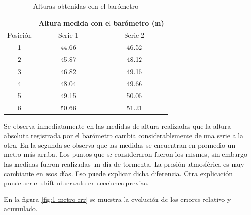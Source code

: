 \documentclass[spanish,12pt,a4paper,titlepage]{report}
\begin{document}
\begin{table}[H]
\centering
\begin{tabular}{c|c|c|} 
	& \multicolumn{2}{|p{200pt}|}{\cellcolor[gray]{0.8} Altura medida con el barómetro (m)}      \\ \hline
\cellcolor[gray]{0.8} {Posición} & \cellcolor[gray]{0.8} {Serie 1} &\cellcolor[gray]{0.8} {Serie 2}\\ \hline

\multicolumn{1}{|c|}{1} & 44.66 & 46.52 \\ \hline
\multicolumn{1}{|c|}{2} & 45.87 & 48.12\\ \hline
\multicolumn{1}{|c|}{3} & 46.82 & 49.15\\ \hline
\multicolumn{1}{|c|}{4} & 48.04 & 49.66\\ \hline
\multicolumn{1}{|c|}{5} & 49.15 & 50.05\\ \hline
\multicolumn{1}{|c|}{6} & 50.66 & 51.21 \\ \hline

\end{tabular}
\caption{Alturas obtenidas con el barómetro}
\label{tab:alturasm}
\end{table}

Se observa inmediatamente en las medidas de altura realizadas que la altura absoluta registrada por el barómetro cambia considerablemente de una serie a la otra. En la segunda se observa que las medidas se encuentran en promedio un metro más arriba. Los puntos que se consideraron fueron los mismos, sin embargo las medidas fueron realizadas un día de tormenta. La presión atmosférica es muy cambiante en esos días. Eso puede explicar dicha diferencia. Otra explicación puede ser el drift observado en secciones previas.

En la figura \ref{fig:1-metro-err} se muestra la evolución de los errores relativo y acumulado.
\end{document}
